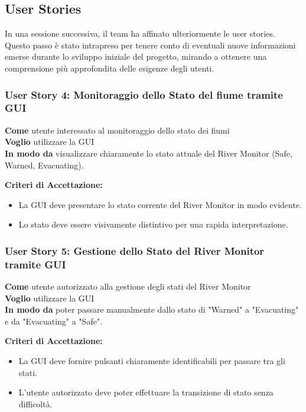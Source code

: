 \subsection{User Stories}

In una sessione successiva, il team ha affinato ulteriormente le user stories. Questo passo è stato intrapreso per tenere conto di eventuali nuove informazioni emerse durante lo sviluppo iniziale del progetto, mirando a ottenere una comprensione più approfondita delle esigenze degli utenti.

\subsubsection{User Story 4: Monitoraggio dello Stato del fiume tramite GUI}

\textbf{Come} utente interessato al monitoraggio dello stato dei fiumi \\
\textbf{Voglio} utilizzare la GUI \\
\textbf{In modo da} visualizzare chiaramente lo stato attuale del River Monitor (Safe, Warned, Evacuating).

\textbf{Criteri di Accettazione:}
\begin{itemize}
    \item La GUI deve presentare lo stato corrente del River Monitor in modo evidente.
    \item Lo stato deve essere visivamente distintivo per una rapida interpretazione.
\end{itemize}

\subsubsection{User Story 5: Gestione dello Stato del River Monitor tramite GUI}

\textbf{Come} utente autorizzato alla gestione degli stati del River Monitor \\
\textbf{Voglio} utilizzare la GUI \\
\textbf{In modo da}  poter passare manualmente dallo stato di "Warned" a "Evacuating" e da "Evacuating" a "Safe".

\textbf{Criteri di Accettazione:}
\begin{itemize}
    \item La GUI deve fornire pulsanti chiaramente identificabili per passare tra gli stati.
    \item L'utente autorizzato deve poter effettuare la transizione di stato senza difficoltà.
\end{itemize}

